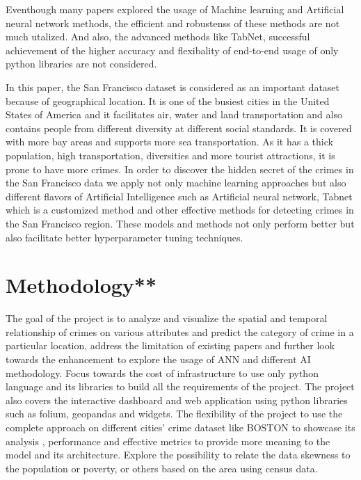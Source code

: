\documentclass[conference,final,]{IEEEtran}
\begin{document}
Eventhough many papers explored the usage of Machine learning and Artificial
neural network methods, the efficient and robustenss of these methods are not 
much utalized. And also, the advanced methods like TabNet, successful 
achievement of the higher accuracy and flexibality of end-to-end usage of 
only python libraries are not considered.

In this paper, the San Francisco dataset is considered as an important
dataset because of geographical location. It is one of the busiest
cities in the United States of America and it facilitates air, water and
land transportation and also contains people from different diversity at
different social standards. It is covered with more bay areas and
supports more sea transportation. As it has a thick population, high
transportation, diversities and more tourist attractions, it is prone to
have more crimes. In order to discover the hidden secret of the crimes
in the San Francisco data we apply not only machine learning approaches
but also different flavors of Artificial Intelligence such as Artificial
neural network, Tabnet which is a customized method and other effective
methods for detecting crimes in the San Francisco region. These models
and methods not only perform better but also facilitate better
hyperparameter tuning techniques.

\section{Methodology**}\label{methodology}

The goal of the project is to analyze and visualize the spatial and
temporal relationship of crimes on various attributes and predict the
category of crime in a particular location, address the limitation of
existing papers and further look towards the enhancement to explore the
usage of ANN and different AI methodology. Focus towards the cost of
infrastructure to use only python language and its libraries to build
all the requirements of the project. The project also covers the
interactive dashboard and web application using python libraries such as
folium, geopandas and widgets. The flexibility of the project to use the
complete approach on different cities' crime dataset like BOSTON to
showcase its analysis , performance and effective metrics to provide
more meaning to the model and its architecture. Explore the possibility
to relate the data skewness to the population or poverty, or others
based on the area using census data.
\end{document}
